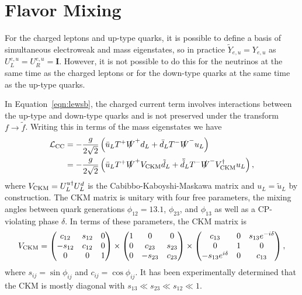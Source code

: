 \section{Flavor Mixing}
\label{sec:flavor}

For the charged leptons and up-type quarks, it is possible to define a basis of simultaneous electroweak and mass eigenstates, so in practice $\tilde Y_{e,u} = Y_{e,u}$ as $U^{e,u}_L = U^{e,u}_R = \mathit{\mathbf{I}}$.
However, it is not possible to do this for the neutrinos at the same time as the charged leptons or for the down-type quarks at the same time as the up-type quarks.

In Equation~\ref{eqn:lewsb}, the charged current term involves interactions between the up-type and down-type quarks and is not preserved under the transform $f \rightarrow \tilde f$.
Writing this in terms of the mass eigenstates we have
\begin{align}
  \mathcal{L}_{\text{CC}} %
  & = - \frac{g}{2\sqrt{2}} \left( \bar u_L T^+ \slashed W^+ d_L + \bar d_L T^- \slashed W^- u_L \right) \nonumber \\
  & = - \frac{g}{2\sqrt{2}} \left( \bar{u}_L  T^+ \slashed W^+ \vckm \tilde{d}_L + \bar{\tilde{d}}_L T^- \slashed W^- \vckm^\dagger u_L \right),
\end{align}
where $V_{\text{CKM}} = U^{u\dagger}_L U^d_L$ is the Cabibbo-Kaboyshi-Maskawa matrix and $u_L = \tilde{u}_L$ by construction.
The CKM matrix is unitary with four free parameters, the mixing angles between quark generations $\phi_{12} = 13.1$, $\phi_{23}$, and $\phi_{13}$ as well as a CP-violating phase $\delta$.
In terms of these parameters, the CKM matrix is
\begin{equation}
  V_{\text{CKM}} = \begin{pmatrix} c_{12} & s_{12} & 0 \\ - s_{12} & c_{12} & 0 \\ 0 & 0 & 1 \end{pmatrix}
  \times \begin{pmatrix} 1 & 0 & 0  \\ 0 & c_{23} & s_{23} \\ 0 & - s_{23} & c_{23} \end{pmatrix}
  \times \begin{pmatrix} c_{13} & 0 & s_{13} e^{-i\delta} \\ 0 & 1 & 0 \\ -s_{13} e^{i\delta} & 0 & c_{13} \end{pmatrix},
\end{equation}
where $s_{ij} = \sin \phi_{ij}$ and $c_{ij} = \cos \phi_{ij}$.
It has been experimentally determined that the CKM is mostly diagonal with $s_{13} \ll s_{23} \ll s_{12} \ll 1$. 

